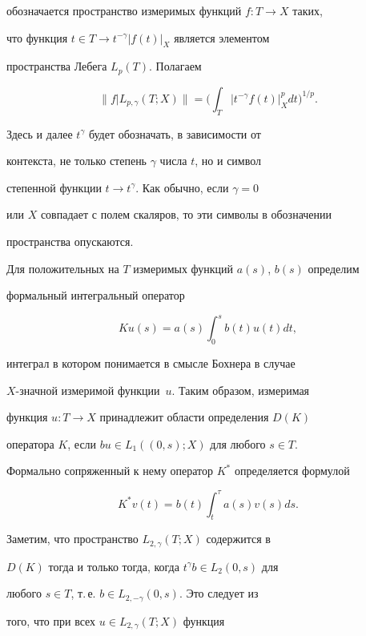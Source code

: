 обозначается пространство измеримых функций $f : T \to X$ таких,


что функция $t \in T \to t^{-\gamma}{|f(t)|}_X$ является элементом


пространства Лебега $L_p(T)$. Полагаем


$$


\|f|L_{p,\gamma}(T;X)\|=\bigg(\int_T {|t^{-\gamma}


f(t)|}_X^p d t \bigg)^{1/p}.


$$


Здесь и далее $t^\gamma$ будет обозначать, в зависимости от


контекста, не только степень $\gamma$ числа $t$, но и символ


степенной функции $t \to t^\gamma$. Как обычно, если $\gamma=0$


или $X$ совпадает с полем скаляров, то эти символы в обозначении


пространства опускаются.





Для положительных на $T$ измеримых функций $a(s)$, $b(s)$ определим


формальный интегральный оператор


\begin{equation}\label{K}


K u(s) = a(s) \int_0^s b(t) u(t) d t,


\end{equation}


интеграл в котором понимается в смысле Бохнера в случае


$X$-значной измеримой функции~$u$. Таким образом, измеримая


функция $u:T \to X$ принадлежит области определения $D(K)$


оператора $K$, если $b u \in L_1((0,s);X)$ для любого $s \in T$.


Формально сопряженный к нему оператор $K^*$ определяется формулой


$$


K^* v(t) = b(t) \int_t^\tau a(s) v(s) d s.


$$


Заметим, что пространство $L_{2,\gamma}(T;X)$ содержится в


$D(K)$ тогда и только тогда, когда $t^\gamma b \in L_2(0,s)$ для


любого $s \in T$, т.\,е. $b \in L_{2,-\gamma}(0,s)$. Это следует из


того, что при всех $u \in L_{2,\gamma}(T;X)$ функция



